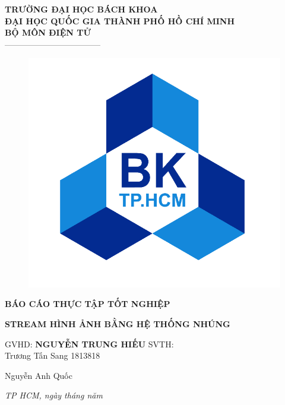 \documentclass[D:/Latex/Internship/Report/Latex/Report.tex]{subfiles}
\begin{document}
	\begin{center}
		\large \textbf{TRƯỜNG ĐẠI HỌC BÁCH KHOA} \\ 
		\large \textbf{ĐẠI HỌC QUỐC GIA THÀNH PHỐ HỒ CHÍ MINH} \\
		\large \textbf{BỘ MÔN ĐIỆN TỬ}	\\
		-----------------------------------	\\
		\vspace{1cm}
		\begin{figure}[h!]
			\includegraphics[scale = 0.7]{Figure/LogoBK.png}
			\centering
		\end{figure}	
		\vspace{1.5cm}
		\textbf{\Large BÁO CÁO THỰC TẬP TỐT NGHIỆP}

		\vspace{1cm}
		\textbf{\LARGE STREAM HÌNH ẢNH BẰNG HỆ THỐNG NHÚNG}
	\end{center}

	\vspace{0.5cm}
	\begin{flushleft}
		\large GVHD: \textbf{NGUYỄN TRUNG HIẾU} 
		\newline
		\newline
		\Large SVTH:	\\
		\large \hspace{1.5cm}	Trương Tấn Sang  \hspace{1cm}	1813818		

		\vspace{0.2cm}
		\large \hspace{1.5cm}	Nguyễn Anh Quốc
	\end{flushleft}

	\begin{center}
		\vspace{5cm}
		\Large \textit{TP HCM, ngày  tháng năm}
	\end{center}
	
\end{document}
